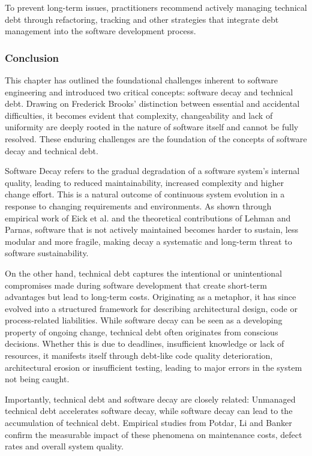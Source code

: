 To prevent long-term issues, practitioners recommend actively managing technical debt through refactoring, tracking and other strategies that integrate debt management into the software development process.

\subsubsection{Conclusion}
This chapter has outlined the foundational challenges inherent to software engineering and introduced two critical concepts: software decay and technical debt.
Drawing on Frederick Brooks' distinction between essential and accidental difficulties, it becomes evident that complexity, changeability and lack of uniformity are deeply rooted in the nature of software itself and cannot be fully resolved.
These enduring challenges are the foundation of the concepts of software decay and technical debt.

Software Decay refers to the gradual degradation of a software system's internal quality, leading to reduced maintainability, increased complexity and higher change effort. This is a natural outcome of continuous system evolution in a response to changing requirements and environments.
As shown through empirical work of Eick et al. and the theoretical contributions of Lehman and Parnas, software that is not actively maintained becomes harder to sustain, less modular and more fragile, making decay a systematic and long-term threat to software sustainability.

On the other hand, technical debt captures the intentional or unintentional compromises made during software development that create short-term advantages but lead to long-term costs. Originating as a metaphor, it has since evolved into a structured framework for describing architectural design, code or process-related liabilities.
While software decay can be seen as a developing property of ongoing change, technical debt often originates from conscious decisions. Whether this is due to deadlines, insufficient knowledge or lack of resources, it manifests itself through debt-like code quality deterioration, architectural erosion or insufficient testing, leading to major errors in the system not being caught.

Importantly, technical debt and software decay are closely related: Unmanaged technical debt accelerates software decay, while software decay can lead to the accumulation of technical debt. Empirical studies from Potdar, Li and Banker confirm the measurable impact of these phenomena on maintenance costs, defect rates and overall system quality.

